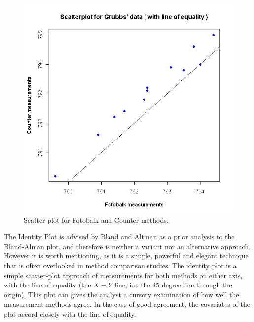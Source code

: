 \documentclass[12pt, a4paper]{report}
\theoremstyle{plain}
\theoremstyle{definition}
\theoremstyle{remark}
\begin{document}
	\begin{figure}[h!]
		\begin{center}
			\includegraphics[width=125mm]{images/GrubbsScatter.jpeg}
			\caption{Scatter plot for Fotobalk and Counter methods.}\label{GrubbsScatter}
		\end{center}
	\end{figure}
	The Identity Plot is advised by Bland and Altman as a prior analysis to the Bland-Alman plot, and therefore is neither a variant nor an alternative approach. However it is worth mentioning, as it is a simple, powerful and elegant technique that is often overlooked in method comparison studies. The identity plot is a simple scatter-plot approach of measurements for both methods on either axis, with the line of equality (the $X=Y$ line, i.e. the 45 degree line through the origin). This plot can gives the analyst a cursory examination of how well the measurement methods agree. In the case of good agreement, the covariates of the plot accord closely with the line of equality.
	
\end{document}
